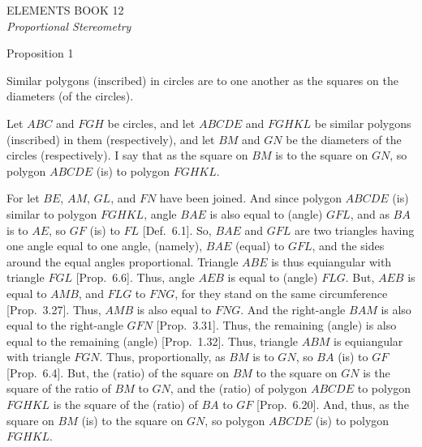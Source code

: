 \pagestyle{plain}
\begin{center}
{\Huge ELEMENTS BOOK 12}\\
\spa\spa\spa
{\huge\it Proportional Stereometry}
\end{center}
\newpage

\pagestyle{fancy}
\cfoot{\gr{\thepage}}

\begin{center}
{\large Proposition 1}
\end{center}

Similar polygons (inscribed) in circles are to one another
as the squares on the diameters (of the circles).

\epsfysize=1.5in
\centerline{}

Let $ABC$ and $FGH$ be circles, and let $ABCDE$ and $FGHKL$ be
similar polygons (inscribed) in them (respectively), and let $BM$ and
$GN$ be the diameters of the circles (respectively). I say that as the square on
$BM$ is to the square on $GN$, so polygon $ABCDE$ (is) to polygon
$FGHKL$.

For let $BE$, $AM$, $GL$, and $FN$ have been joined. And since polygon
$ABCDE$ (is) similar to polygon $FGHKL$, angle $BAE$ is also equal to
(angle) $GFL$, and as $BA$ is to $AE$, so $GF$ (is) to  $FL$ [Def.~6.1]. So, $BAE$ and $GFL$ are two triangles having one angle
equal to one angle, (namely), $BAE$ (equal) to $GFL$, and the sides
around the equal angles proportional. Triangle $ABE$ is thus equiangular with
triangle $FGL$ [Prop.~6.6]. Thus, angle $AEB$ is equal to
(angle) $FLG$. But, $AEB$ is equal to $AMB$, and $FLG$ to $FNG$, for they stand on the same
circumference [Prop.~3.27].
Thus, $AMB$ is also equal to $FNG$. And the right-angle $BAM$ is also
equal to the right-angle $GFN$ [Prop.~3.31]. 
Thus, the remaining (angle) is also equal to the remaining (angle) [Prop.~1.32]. Thus,
triangle $ABM$ is equiangular with triangle $FGN$. Thus, proportionally, as $BM$
is to $GN$, so $BA$ (is) to $GF$ [Prop.~6.4]. But, 
the (ratio) of the square on $BM$ to the square
on $GN$ is the square of the
ratio of $BM$ to $GN$, and  the (ratio) of
polygon $ABCDE$ to polygon $FGHKL$ is the square of the (ratio) of $BA$ to $GF$ [Prop.~6.20].  
And, thus, as the square on $BM$ (is) to the square on $GN$, so polygon $ABCDE$
(is) to polygon $FGHKL$. 

